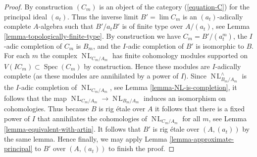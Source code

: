 \documentclass{stacks-project}
\theoremstyle{plain}
\theoremstyle{definition}
\theoremstyle{remark}
\numberwithin{equation}{subsection}
\def\lim{\mathop{\mathrm{lim}}\nolimits}
\def\Spec{\mathop{\mathrm{Spec}}}
\def\NL{\mathop{N\!L}\nolimits}
\begin{document}
\begin{proof}
\medskip\noindent
By construction $(C_m)$ is an object of the category
(\ref{equation-C}) for the principal ideal $(a_t)$.
Thus the inverse limit $B' = \lim C_m$ is an $(a_t)$-adically
complete $A$-algebra such that $B'/a_t B'$ is of finite type
over $A/(a_t)$, see Lemma \ref{lemma-topologically-finite-type}.
By construction we have $C_m = B'/(a_t^m)$, the $I$-adic
completion of $C_m$ is $B_m$, and the $I$-adic completion of
$B'$ is isomorphic to $B$.
For each $m$ the complex $\NL_{C_m/A_m}$ has finite cohomology
modules supported on $V(IC_m) \subset \Spec(C_m)$ by construction.
Hence these modules are $I$-adically complete (as these modules
are annihilated by a power of $I$). Since $\NL^\wedge_{B_m/A_m}$
is the $I$-adic completion of $\NL_{C_m/A_m}$, see
Lemma \ref{lemma-NL-is-completion}, it
follows that the map $\NL_{C_m/A_m} \to \NL_{B_m/A_m}$ induces
an isomorphism on cohomologies. Thus because $B$ is rig \'etale
over $A$ it follows that there is a fixed power of $I$ that annihilates
the cohomologies of $\NL_{C_m/A_m}$ for all $m$, see
Lemma \ref{lemma-equivalent-with-artin}. It follows that $B'$
is rig \'etale over $(A, (a_t))$ by the same lemma.
Hence finally, we may apply Lemma \ref{lemma-approximate-principal}
to $B'$ over $(A, (a_t))$ to finish the proof.
\end{proof}
\end{document}
